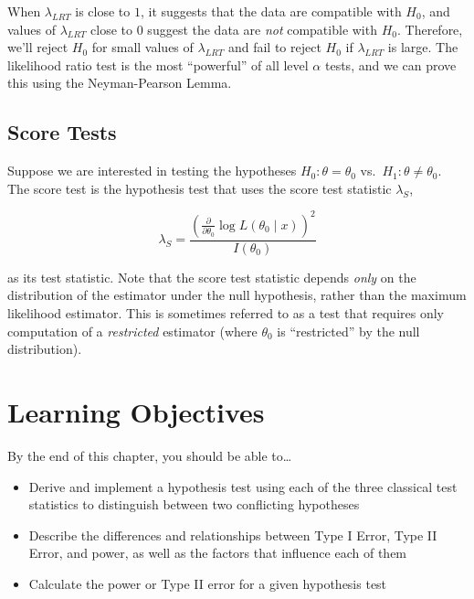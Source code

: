 \documentclass[
  letterpaper,
  DIV=11,
  numbers=noendperiod]{scrreprt}
\providecommand{\tightlist}{%
  \setlength{\itemsep}{0pt}\setlength{\parskip}{0pt}}\usepackage{longtable,booktabs,array}
\begin{document}
When \(\lambda_{LRT}\) is close to \(1\), it suggests that the data are
compatible with \(H_0\), and values of \(\lambda_{LRT}\) close to \(0\)
suggest the data are \emph{not} compatible with \(H_0\). Therefore,
we'll reject \(H_0\) for small values of \(\lambda_{LRT}\) and fail to
reject \(H_0\) if \(\lambda_{LRT}\) is large. The likelihood ratio test
is the most ``powerful'' of all level \(\alpha\) tests, and we can prove
this using the Neyman-Pearson Lemma.

\hypertarget{score-tests}{%
\subsection*{Score Tests}\label{score-tests}}

Suppose we are interested in testing the hypotheses
\(H_0: \theta = \theta_0\) vs.~\(H_1: \theta \neq \theta_0\). The score
test is the hypothesis test that uses the score test statistic
\(\lambda_S\),

\[
\lambda_S = \frac{\left( \frac{\partial}{\partial \theta_0} \log L(\theta_0 \mid x) \right)^2}{I(\theta_0)}
\]

as its test statistic. Note that the score test statistic depends
\emph{only} on the distribution of the estimator under the null
hypothesis, rather than the maximum likelihood estimator. This is
sometimes referred to as a test that requires only computation of a
\emph{restricted} estimator (where \(\theta_0\) is ``restricted'' by the
null distribution).

\hypertarget{learning-objectives-6}{%
\section{Learning Objectives}\label{learning-objectives-6}}

By the end of this chapter, you should be able to\ldots{}

\begin{itemize}
\tightlist
\item
  Derive and implement a hypothesis test using each of the three
  classical test statistics to distinguish between two conflicting
  hypotheses
\item
  Describe the differences and relationships between Type I Error, Type
  II Error, and power, as well as the factors that influence each of
  them
\item
  Calculate the power or Type II error for a given hypothesis test
\end{itemize}
\end{document}
